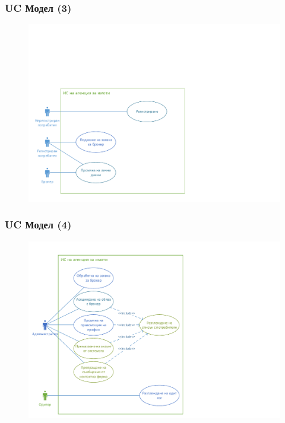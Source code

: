 \documentclass[12pt]{beamer}
\begin{document}
\begin{frame}[fragile]
\frametitle{UC Модел (3)}
        \begin{figure}[h]
        \centering
        \includegraphics[scale=0.5]{uc2c}
        \end{figure}
\end{frame}

\begin{frame}[fragile]
\frametitle{UC Модел (4)}
        \begin{figure}[h]
        \centering
        \includegraphics[scale=0.5]{uc2d}
        \end{figure}
\end{frame}
\end{document}
